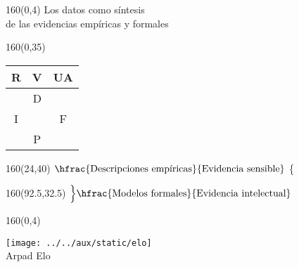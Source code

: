 \documentclass[shownotes,aspectratio=169]{beamer}
\newif\ifen
\newif\ifes
\newcommand{\en}[1]{\ifen#1\fi}
\newcommand{\es}[1]{\ifes#1\fi}
\begin{document}
\begin{frame}[plain]
\begin{textblock}{160}(0,4)
 \centering \LARGE
 Los datos como síntesis \\ \Large de las evidencias empíricas y formales
\end{textblock}
\vspace{0.75cm}

\begin{textblock}{160}(0,35)
\centering
\begin{tabular}{ccc}
R &    \multicolumn{1}{|c}{V}  &  \multicolumn{1}{|c}{UA} \\ \hline
   &  \multicolumn{1}{|c}{D}      & \multicolumn{1}{|c}{} \\
                 I  &   & F \\
 & \multicolumn{1}{|c}{P}  &      \multicolumn{1}{|c}{} 
 \end{tabular}
\end{textblock}

\begin{textblock}{160}(24,40)
$\hfrac{\text{\normalsize Descripciones empíricas}}{\text{\normalsize Evidencia sensible}}$  \Bigg\{
\end{textblock}

\begin{textblock}{160}(92.5,32.5)
$\Big\} \hfrac{\text{\normalsize Modelos formales}}{\text{\normalsize Evidencia intelectual}}$
\end{textblock}




 \end{frame}


 
\begin{frame}[plain]
\begin{textblock}{160}(0,4)
\centering  \LARGE 
 \en{How to measure skills?}
 \es{¿Cómo medir habilidades?}
 \end{textblock}
\vspace{1cm}

\centering
 
 \texttt{[image: ../../aux/static/elo]} \\
 \vspace{0.1cm}
 Arpad Elo
   
\end{frame}
\end{document}
